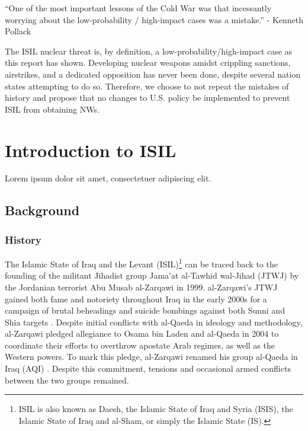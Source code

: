 \documentclass{report}
\newcommand{\shortlipsum}{Lorem ipsum dolor sit amet, consectetuer adipiscing 
elit.}
\begin{document}
\enquote{One of the most important lessons of the Cold War was that incessantly worrying about the low-probability / high-impact cases was a mistake.}  - Kenneth Pollack \cite{pollack2014unthinkable}

The ISIL nuclear threat is, by definition, a low-probability/high-impact case as this report has shown.  Developing nuclear weapons amidst crippling sanctions, airstrikes, and a dedicated opposition has never been done, despite several nation states attempting to do so.  Therefore, we choose to not repeat the mistakes of history and propose that no changes to U.S. policy be implemented to prevent ISIL from obtaining NWs.





\chapter{Introduction to ISIL}





   \shortlipsum
   

    
    
    
    \section{Background}
    
    \subsection{History}
    
    The Islamic State of Iraq and the Levant (ISIL)\footnote{ISIL is also known as Daesh, the Islamic State of Iraq and Syria (ISIS),  the Islamic State of Iraq and al-Sham, or simply the Islamic State (IS).} can be traced back to the founding of the militant Jihadist group Jama'at al-Tawhid wal-Jihad (JTWJ) by the Jordanian terrorist Abu Musab al-Zarqawi in 1999. al-Zarqawi's JTWJ gained both fame and notoriety throughout Iraq in the early 2000s for  a campaign of brutal beheadings and suicide bombings against both Sunni and Shia targets \cite{Zelin2014}. Despite initial conflicts with al-Qaeda in ideology and methodology, al-Zarqawi pledged allegiance to Osama bin Laden and al-Qaeda in 2004 to coordinate  their efforts to overthrow apostate Arab regimes, as well as the Western powers. To mark this pledge, al-Zarqawi renamed his group al-Qaeda in Iraq  (AQI) \cite{Gambill2004}. Despite this commitment, tensions and occasional armed conflicts between the two groups remained.
    
\end{document}
